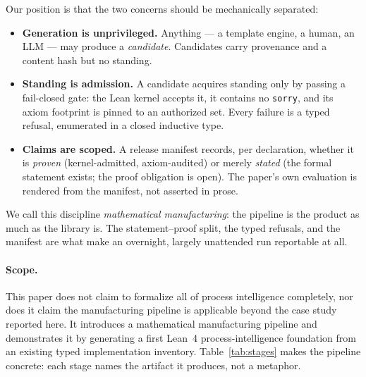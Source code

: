 \documentclass[11pt]{article}
\begin{document}
Our position is that the two concerns should be mechanically separated:

\begin{itemize}
\item \textbf{Generation is unprivileged.} Anything --- a template engine, a
  human, an LLM --- may produce a \emph{candidate}. Candidates carry
  provenance and a content hash but no standing.
\item \textbf{Standing is admission.} A candidate acquires standing only by
  passing a fail-closed gate: the Lean kernel accepts it, it contains no
  \texttt{sorry}, and its axiom footprint is pinned to an authorized set.
  Every failure is a typed refusal, enumerated in a closed inductive type.
\item \textbf{Claims are scoped.} A release manifest records, per
  declaration, whether it is \emph{proven} (kernel-admitted, axiom-audited)
  or merely \emph{stated} (the formal statement exists; the proof
  obligation is open). The paper's own evaluation is rendered from the
  manifest, not asserted in prose.
\end{itemize}

We call this discipline \emph{mathematical manufacturing}: the pipeline is
the product as much as the library is. The statement--proof split, the typed
refusals, and the manifest are what make an overnight, largely unattended
run reportable at all.

\paragraph{Scope.} This paper does not claim to formalize all of process
intelligence completely, nor does it claim the manufacturing pipeline is
applicable beyond the case study reported here. It introduces a
mathematical manufacturing pipeline and demonstrates it by generating a
first Lean~4 process-intelligence foundation from an existing typed
implementation inventory. Table~\ref{tab:stages} makes the pipeline
concrete: each stage names the artifact it produces, not a metaphor.
\end{document}
